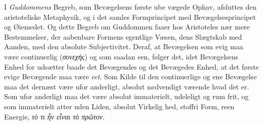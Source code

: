 \documentclass[12pt,a4paper]{book}
\newcommand{\gk}[1]{\textit{#1}}
\begin{document}
I \emph{Guddommens} Begreb, som Bevægelsens første ube\-%
vægede Ophav, afsluttes den aristoteliske Metaphysik, og i det
samles Formprincipet med Bevægelsesprincipet og Øiemedet.
Og dette Begreb om Guddommen faaer hos Aristoteles nær\-%
mere Bestemmelser, der aabenbare Formens egentlige Væsen,
dens Slægtskab med Aanden, med den absolute Subjectivitet.
Deraf, at Bevægelsen som evig maa være continuerlig (\gk{συνεχὴς})
og som saadan een, følger det, idet Bevægelsens Enhed for\-%
udsætter baade det Bevægendes og det Bevægedes Enhed, at
det første evige Bevægende maa være \emph{eet}. Som Kilde til den
continuerlige og ene Bevægelse maa det dernæst være ufor\-%
anderligt, absolut nødvendigt værende hvad det er. Som ufor\-%
anderligt maa det være absolut immaterielt, udeleligt og rum\-%
frit, og som immaterielt atter uden Liden, absolut Virkelig\-%
hed, stoffri Form, reen Energie, \gk{τὸ τι ἦν εἶναι τὸ πρῶτον}.
\end{document}
